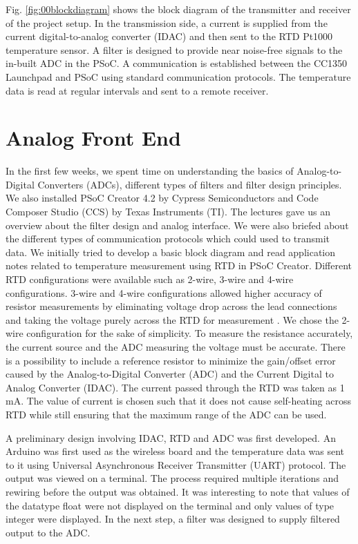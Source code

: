 \documentclass[conference]{IEEEtran}
\begin{document}
Fig. \ref{fig:00blockdiagram} shows the block diagram of the transmitter and receiver of the project setup. In the transmission side, a current is supplied from the current digital-to-analog converter (IDAC) and then sent to the RTD Pt1000 temperature sensor. A filter is designed to provide near noise-free signals to the in-built ADC in the PSoC. A communication is established between the CC1350 Launchpad and PSoC using standard communication protocols. The temperature data is read at regular intervals and sent to a remote receiver.

\section{Analog Front End}

In the first few weeks, we spent time on understanding the basics of Analog-to-Digital Converters (ADCs), different types of filters and filter design principles. We also installed PSoC Creator 4.2 by Cypress Semiconductors and Code Composer Studio (CCS) by Texas Instruments (TI). The lectures gave us an overview about the filter design and analog interface. We were also briefed about the different types of communication protocols which could used to transmit data. We initially tried to develop a basic block diagram and read application notes related to temperature measurement using RTD in PSoC Creator. Different RTD configurations were available such as 2-wire, 3-wire and 4-wire configurations. 3-wire and 4-wire configurations allowed higher accuracy of resistor measurements by eliminating voltage drop across the lead connections and taking the voltage purely across the RTD for measurement \cite{b1}. We chose the 2-wire configuration for the sake of simplicity. To measure the resistance accurately, the current source and the ADC measuring the voltage must be accurate. There is a possibility to include a reference resistor to minimize the gain/offset error caused by the Analog-to-Digital Converter (ADC) and the Current Digital to Analog Converter (IDAC). The current passed through the RTD was taken as 1 mA. The value of current is chosen such that it does not cause self-heating across RTD while still ensuring that the maximum range of the ADC can be used. 

A preliminary design involving IDAC, RTD and ADC was first developed. An Arduino was first used as the wireless board and the temperature data was sent to it using Universal Asynchronous Receiver Transmitter (UART) protocol. The output was viewed on a terminal. The process required multiple iterations and rewiring before the output was obtained. It was interesting to note that values of the datatype float were not displayed on the terminal and only values of type integer were displayed. In the next step, a filter was designed to supply filtered output to the ADC. 
\end{document}
